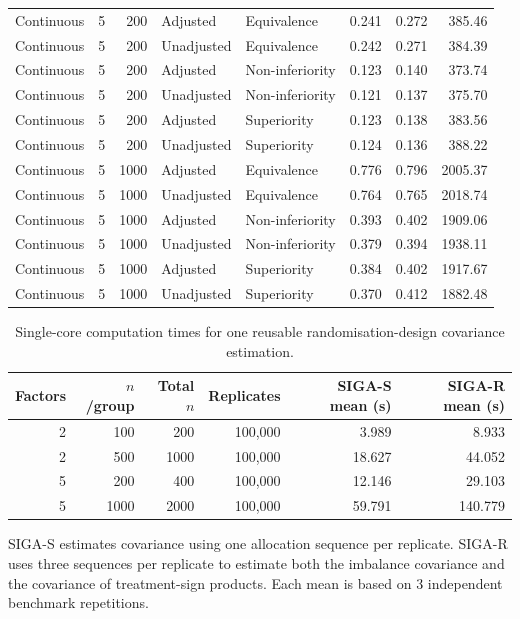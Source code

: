 \documentclass[12pt,a4paper]{article}
\theoremstyle{definition}
\theoremstyle{remark}\newtheorem{remark}{Remark}
\numberwithin{equation}{section}
\begin{document}
\begin{singlespace}
\begin{longtable}{@{}lcrllrrr@{}}
Continuous & 5 & 200 & Adjusted & Equivalence & 0.241 & 0.272 & 385.46 \\
Continuous & 5 & 200 & Unadjusted & Equivalence & 0.242 & 0.271 & 384.39 \\
Continuous & 5 & 200 & Adjusted & Non-inferiority & 0.123 & 0.140 & 373.74 \\
Continuous & 5 & 200 & Unadjusted & Non-inferiority & 0.121 & 0.137 & 375.70 \\
Continuous & 5 & 200 & Adjusted & Superiority & 0.123 & 0.138 & 383.56 \\
Continuous & 5 & 200 & Unadjusted & Superiority & 0.124 & 0.136 & 388.22 \\

Continuous & 5 & 1000 & Adjusted & Equivalence & 0.776 & 0.796 & 2005.37 \\
Continuous & 5 & 1000 & Unadjusted & Equivalence & 0.764 & 0.765 & 2018.74 \\
Continuous & 5 & 1000 & Adjusted & Non-inferiority & 0.393 & 0.402 & 1909.06 \\
Continuous & 5 & 1000 & Unadjusted & Non-inferiority & 0.379 & 0.394 & 1938.11 \\
Continuous & 5 & 1000 & Adjusted & Superiority & 0.384 & 0.402 & 1917.67 \\
Continuous & 5 & 1000 & Unadjusted & Superiority & 0.370 & 0.412 & 1882.48 \\

\end{longtable}

\endgroup
\end{singlespace}

\begin{table}[!htbp]
\centering
\caption{Single-core computation times for one reusable randomisation-design covariance estimation.}
\label{tab:supp-calibration-times}
\begin{threeparttable}
\begin{singlespace}
\begin{tabular}{rrrrrr}
\toprule
Factors & $n$/group & Total $n$ & Replicates & SIGA-S mean (s) & SIGA-R mean (s) \\
\midrule
2 & 100 & 200 & 100,000 & 3.989 & 8.933 \\
2 & 500 & 1000 & 100,000 & 18.627 & 44.052 \\
5 & 200 & 400 & 100,000 & 12.146 & 29.103 \\
5 & 1000 & 2000 & 100,000 & 59.791 & 140.779 \\
\bottomrule
\end{tabular}
\begin{tablenotes}[flushleft]
\small
\item SIGA-S estimates covariance using one allocation sequence per replicate. SIGA-R uses three sequences per replicate to estimate both the imbalance covariance and the covariance of treatment-sign products. Each mean is based on 3 independent benchmark repetitions.
\end{tablenotes}
\end{singlespace}
\end{threeparttable}
\end{table}
\end{document}
